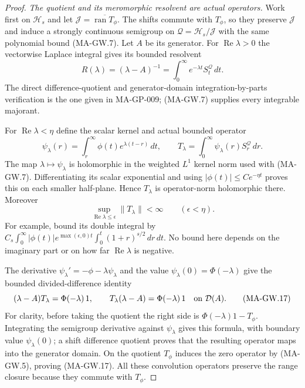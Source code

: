\begin{proof}
\emph{The quotient and its meromorphic resolvent are actual operators.}
Work first on $\mathcal H_s$ and let
$\mathcal J=\overline{\operatorname{ran}T_\phi}$.
The shifts commute with $T_\phi$, so they preserve
$\mathcal J$ and induce a strongly continuous semigroup
on $\mathcal Q=\mathcal H_s/\mathcal J$ with the same
polynomial bound (MA-GW.7).
Let $A$ be its generator.
For $\operatorname{Re}\lambda>0$ the vectorwise
Laplace integral gives its bounded resolvent
\[
          R(\lambda)=(\lambda-A)^{-1}
                     =\int_0^\infty e^{-\lambda t}S_t^{\mathcal Q}\,dt .
 \tag{MA-GW.14}
\]
The direct difference-quotient and generator-domain
integration-by-parts verification is the one given in
MA-GP-009; (MA-GW.7) supplies every integrable majorant.

For $\operatorname{Re}\lambda<\eta$ define the scalar kernel
and actual bounded operator
\[
 \psi_\lambda(r)=\int_r^\infty\phi(t)e^{\lambda(t-r)}\,dt,
 \qquad
 T_\lambda=\int_0^\infty\psi_\lambda(r)S_r^{\mathcal Q}\,dr .
 \tag{MA-GW.15}
\]
The map $\lambda\mapsto\psi_\lambda$ is holomorphic in
the weighted $L^1$ kernel norm used with (MA-GW.7).
Differentiating its scalar exponential and using
$|\phi(t)|\le Ce^{-\eta t}$ proves this on each smaller
half-plane.  Hence $T_\lambda$ is operator-norm
holomorphic there.  Moreover
\[
 \sup_{\operatorname{Re}\lambda\le\epsilon}\|T_\lambda\|<\infty
                      \qquad(\epsilon<\eta).
 \tag{MA-GW.16}
\]
For example, bound its double integral by
$C_s\int_0^\infty|\phi(t)|e^{\max(\epsilon,0)t}
\int_0^t(1+r)^{s/2}\,dr\,dt$.
No bound here depends on the imaginary part or on how
far $\operatorname{Re}\lambda$ is negative.

The derivative $\psi_\lambda'=-\phi-\lambda\psi_\lambda$
and the value $\psi_\lambda(0)=\Phi(-\lambda)$ give
the bounded divided-difference identity
\[
 (\lambda-A)T_\lambda=\Phi(-\lambda)\,1,\qquad
 T_\lambda(\lambda-A)=\Phi(-\lambda)\,1
                                      \quad\hbox{on }\mathcal D(A).
 \tag{MA-GW.17}
\]
For clarity, before taking the quotient the right side is
$\Phi(-\lambda)1-T_\phi$.
Integrating the semigroup derivative against
$\psi_\lambda$ gives this formula, with boundary value
$\psi_\lambda(0)$; a shift difference quotient proves
that the resulting operator maps into the generator
domain.  On the quotient $T_\phi$ induces the zero
operator by (MA-GW.5), proving (MA-GW.17).
All these convolution operators preserve the range
closure because they commute with $T_\phi$.


\end{proof}
